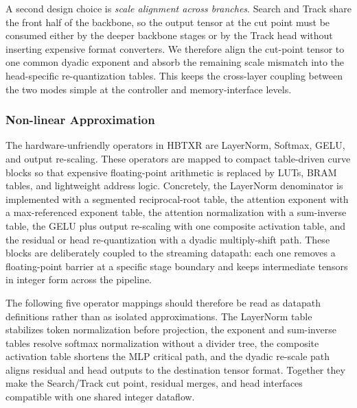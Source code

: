 \documentclass[journal]{IEEEtran}
\begin{document}
A second design choice is \emph{scale alignment across branches}. Search and Track share the front half of the backbone, so the output tensor at the cut point must be consumed either by the deeper backbone stages or by the Track head without inserting expensive format converters. We therefore align the cut-point tensor to one common dyadic exponent and absorb the remaining scale mismatch into the head-specific re-quantization tables. This keeps the cross-layer coupling between the two modes simple at the controller and memory-interface levels.

\subsubsection{Non-linear Approximation}
The hardware-unfriendly operators in HBTXR are LayerNorm, Softmax, GELU, and output re-scaling. These operators are mapped to compact table-driven curve blocks so that expensive floating-point arithmetic is replaced by LUTs, BRAM tables, and lightweight address logic. Concretely, the LayerNorm denominator is implemented with a segmented reciprocal-root table, the attention exponent with a max-referenced exponent table, the attention normalization with a sum-inverse table, the GELU plus output re-scaling with one composite activation table, and the residual or head re-quantization with a dyadic multiply-shift path. These blocks are deliberately coupled to the streaming datapath: each one removes a floating-point barrier at a specific stage boundary and keeps intermediate tensors in integer form across the pipeline.

The following five operator mappings should therefore be read as datapath definitions rather than as isolated approximations. The LayerNorm table stabilizes token normalization before projection, the exponent and sum-inverse tables resolve softmax normalization without a divider tree, the composite activation table shortens the MLP critical path, and the dyadic re-scale path aligns residual and head outputs to the destination tensor format. Together they make the Search/Track cut point, residual merges, and head interfaces compatible with one shared integer dataflow.
\end{document}
